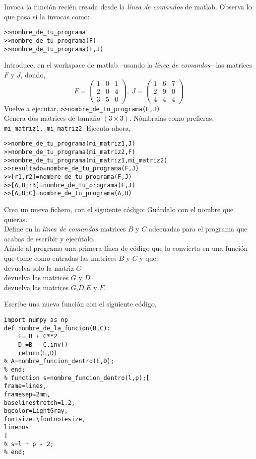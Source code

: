 \begin{enumerate}
Invoca la función recién creada desde la \emph{línea de comandos} de matlab. Observa lo que pasa si la invocas como:
\begin{verbatim}
>>nombre_de_tu_programa
>>nombre_de_tu_programa(F)
>>nombre_de_tu_programa(F,J)
\end{verbatim}
Introduce, en el  workspace de matlab --usando la \emph{línea de comandos}--  las matrices $F$ y $J$, dondo,
\begin{equation*}
F =\begin{pmatrix}
1&0&1\\
2&0&4\\
3&5&0
\end{pmatrix}, \ J=\begin{pmatrix}
1&6&7\\
2&9&0\\
4&4&4
\end{pmatrix}
\end{equation*}
Vuelve a ejecutar, \verb|>>nombre_de_tu_programa(F,J)| \\
Genera dos matrices de tamaño $(3\times 3)$. Nómbralas como prefieras: \verb|mi_matriz1, mi_matriz2|. Ejecuta ahora,
\begin{verbatim}
>>nombre_de_tu_programa(mi_matriz1,J)
>>nombre_de_tu_programa(mi_matriz2,F)
>>nombre_de_tu_programa(mi_matriz1,mi_matriz2)
>>resultado=nombre_de_tu_programa(F,J)
>>[r1,r2]=nombre_de_tu_programa(F,J)
>>[A,B;r3]=nombre_de_tu_programa(F,J)
>>[A,B;C]=nombre_de_tu_programa(A,B)
\end{verbatim}
Crea un nuevo fichero, con el siguiente código:
Guárdalo con el nombre que quieras.\\
Define en la \emph{línea de comandos} matrices $B$ y $C$ adecuadas para el programa que acabas de escribir y ejecútalo.\\
Añade al programa una primera línea de código que lo convierta en una función que tome como entradas las matrices $B$ y $C$  y que:\\
devuelva solo la matriz $G$\\
devuelva las matrices $G$ y $D$\\ 
devuelva las matrices $G$,$D$,$E$ y $F$.

Escribe una nueva función con el siguiente código,
\begin{verbatim}
import numpy as np
def nombre_de_la_funcion(B,C):
    E= B + C**2
    D =B - C.inv()
    return(E,D)
% A=nombre_funcion_dentro(E,D);
% end;
% function s=nombre_funcion_dentro(l,p);[
frame=lines,
framesep=2mm,
baselinestretch=1.2,
bgcolor=LightGray,
fontsize=\footnotesize,
linenos
]
% s=l + p - 2;
% end;
\end{verbatim}


\end{enumerate}
